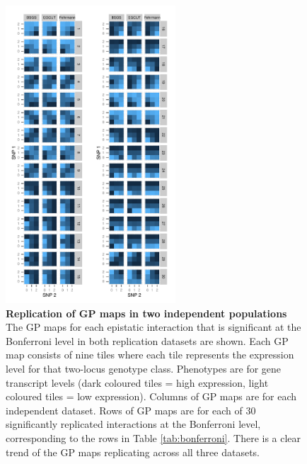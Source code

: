 \documentclass{article}
\begin{document}
\begin{figure}[H]
	\centering
	\includegraphics[width=2.5in]{gpbonfrep.pdf}
	\caption{\textbf{Replication of GP maps in two independent populations} The GP maps for each epistatic interaction that is significant at the Bonferroni level in both replication datasets are shown. Each GP map consists of nine tiles where each tile represents the expression level for that two-locus genotype class. Phenotypes are for gene transcript levels (dark coloured tiles = high expression, light coloured tiles = low expression). Columns of GP maps are for each independent dataset. Rows of GP maps are for each of 30 significantly replicated interactions at the Bonferroni level, corresponding to the rows in Table \ref{tab:bonferroni}. There is a clear trend of the GP maps replicating across all three datasets.}
	\label{fig:gpmaps}
\end{figure}
\end{document}
